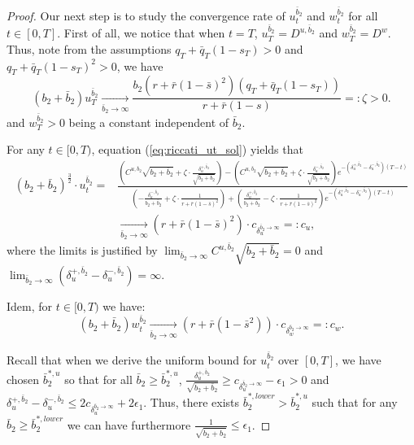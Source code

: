 \documentclass[11pt]{article}
\begin{document}
\begin{proof}
	Our next step is to study the convergence rate of $u_t^{\bar{b}_2}$ and $w_t^{\bar{b}_2}$ for all $t \in [0,T]$. First of all, we notice that when $t =T$, $u_T^{\bar{b}_2} = D^{u,\bar{b}_2}$ and $w_T^{\bar{b}_2} = D^w$. Thus, note from the assumptions  $q_T+\bar{q}_T(1-s_T)>0$ and $q_T+\bar{q}_T(1-s_T)^2>0$, we have
	$$ (b_2 + \bar{b}_2) u_T^{\bar{b}_2} \xrightarrow[\bar{b}_2 \to \infty]{} \frac{b_2 (r+ \bar{r}(1-\bar{s})^2) (q_T + \bar{q}_T(1-s_T))}{r + \bar{r}(1-s)} =: \zeta > 0.$$
	and $ w_T^{\bar{b}_2} >0$ being a constant independent of $\bar{b}_2$.
	
	For any $t \in [0,T)$, equation (\ref{eq:riccati_ut_sol}) yields that
	\begin{equation*}
	\begin{split}
	(b_2 + \bar{b}_2)^{\frac{3}{2}}\cdot u^{\bar{b}_2}_t =& \frac{ \left( C^{u,\bar{b}_2}\sqrt{b_2 + \bar{b}_2} + \zeta \cdot \frac{\delta^{+,\bar{b}_2}_u}{\sqrt{b_2 + \bar{b}_2}}  \right) - \left( C^{u,\bar{b}_2}\sqrt{b_2 + \bar{b}_2} + \zeta \cdot \frac{\delta^{-,\bar{b}_2}_u}{\sqrt{b_2 + \bar{b}_2}}  \right) e^{- (\delta^{+,\bar{b}_2}_u - \delta^{-,\bar{b}_2}_u)(T-t)}}{ \left(- \frac{\delta^{-,\bar{b}_2}_u}{b_2 + \bar{b}_2} + \zeta \cdot \frac{1}{r + \bar{r}(1-\bar{s})^2} \right) + \left( \frac{\delta^{+,\bar{b}_2}_u}{b_2 + \bar{b}_2} -  \zeta \cdot \frac{1}{r + \bar{r}(1-\bar{s})^2} \right)e^{- (\delta^{+,\bar{b}_2}_u - \delta^{-,\bar{b}_2}_u)(T-t)} }\\
	& \xrightarrow[\bar{b}_2 \to \infty]{}  (r + \bar{r}(1-\bar{s})^2) \cdot c_{\delta^{\bar{b}_2 \to \infty}_u}=: c_u,
	\end{split} 
	\end{equation*}
	where the limits is justified by $ \lim_{\bar{b}_2 \to \infty} C^{u,\bar{b}_2} \sqrt{b_2 + \bar{b}_2} = 0$ and $\lim_{\bar{b}_2 \to \infty} (\delta_u^{+,\bar{b}_2} - \delta_u^{-,\bar{b}_2} ) = \infty$.
	
	Idem, for $t \in [0,T)$ we have:
	$$ (b_2 + \bar{b}_2) w_t^{\bar{b}_2} \xrightarrow[\bar{b}_2 \to \infty]{} (r + \bar{r}(1-\bar{s}^2) ) \cdot c_{\delta_w^{\bar{b}_2\to \infty}} =: c_w. $$
	
	Recall that when we derive the uniform bound for $u_t^{\bar{b}_2}$ over $[0,T]$, we have chosen $\bar{b}_2^{*,u}$ so that for all $\bar{b}_2 \geq \bar{b}_2^{*,u}$, $\frac{\delta_u^{+,\bar{b}_2} }{\sqrt{b_2 + \bar{b}_2}} \geq c_{\delta_u^{\bar{b}_2 \to \infty} } - \epsilon_1 > 0$ and $\delta_u^{+,\bar{b}_2} - \delta_u^{-,\bar{b}_2} \leq 2 c_{\delta_u^{\bar{b}_2 \to \infty}} + 2 \epsilon_1 $. Thus, there exists $\bar{b}_2^{*,lower} > \bar{b}_2^{*,u}$ such that for any $\bar{b}_2 \geq \bar{b}_2^{*,lower}$ we can have furthermore $\frac{1}{\sqrt{b_2 + \bar{b}_2}} \leq \epsilon_1$. 
		

\end{proof}
\end{document}
